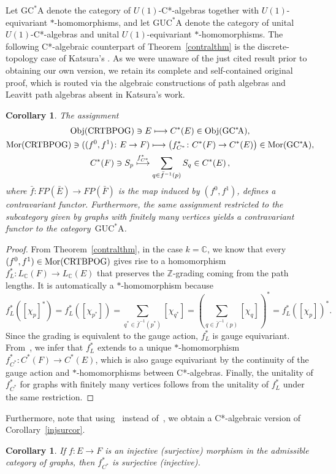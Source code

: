 \documentclass[12pt,times,a4paper]{amsart}
\newtheorem{corollary}[theorem]{Corollary}
\numberwithin{equation}{section}
\numberwithin{equation}{section}
\begin{document}
Let $\mathrm{GC^*\!A}$ denote the category of $U(1)$-C*-algebras together with $U(1)$-equivariant $*$-homo\-morphisms,
 and let $\mathrm{GUC^*\!A}$ denote the category of unital $U(1)$-C*-algebras and unital $U(1)$-equivariant $*$-homomorphisms.
The following C*-algebraic counterpart of Theorem~\ref{contralthm} is the discrete-topology case of Katsura's
\cite[Proposition~2.9]{t-k06}. As we were
unaware of the just cited result prior to obtaining our own version, we retain its complete and self-contained original proof,
which is routed via the algebraic constructions of path algebras and Leavitt path algebras absent in Katsura's work.
\begin{corollary}\label{corgc*}
The assignment
\begin{gather*}
\mathrm{Obj}({\rm CRTBPOG})\ni E\stackrel{}{\longmapsto}C^*(E)\in\mathrm{Obj}(\mathrm{GC^*\!A}),\nonumber\\
\mathrm{Mor}({\rm CRTBPOG})\ni ((f^0,f^1)\colon E\to F)
\stackrel{}{\longmapsto}\big(f^*_{C^*}\colon C^*(F)\to C^*(E)\big)\in\mathrm{Mor}(\mathrm{GC^*\!A}),
\nonumber\\
C^*(F)\ni S_p\stackrel{f^*_{C^*}}{\longmapsto}\sum_{q\in \bar{f}^{-1}(p)}S_q\in C^*(E)\,,%
\nonumber
\end{gather*}
where $\bar{f}\colon FP(\bar{E})\to FP(\bar{F})$ is the map induced by $(f^0,f^1)$, defines a contravariant functor. Furthermore, 
the same assignment restricted to the subcategory 
given by graphs with finitely many vertices yields a contravariant functor to the category~$\mathrm{GUC^*\!A}$. 
\end{corollary}
\begin{proof}
From Theorem~\ref{contralthm}, in the case $k=\mathbb{C}$, we know that every 
$(f^0,f^1)\in{\rm Mor}(\mathrm{CRTBPOG})$ gives rise to 
a homomorphism ${f}^*_L\colon L_\mathbb{C}(F)\to L_\mathbb{C}(E)$ that preserves the $\mathbb{Z}$-grading
 coming from the path lengths. It is automatically a $*$-homomorphism because
\begin{equation}
{f}^*_L([\chi_p]^*)={f}^*_L([\chi_{p^*}])=\sum_{q^*\in\bar{f}^{-1}(p^*)}[\chi_{q^*}]=\left(\sum_{q\in\bar{f}^{-1}(p)}
[\chi_q]\right)^*={f}^*_L([\chi_p])^*.
\end{equation}
Since the grading is equivalent to the gauge action, ${f}^*_L$ is gauge equivariant. 
From~\cite[Theorem~4.4]{at-11}, we infer that ${f}^*_L$ extends to
 a unique $*$-homomorphism $f^*_{C^*}\colon C^*(F)\to C^*(E)$, which is also gauge equivariant by the continuity
of the gauge action and $*$-homomorphisms between C*-algebras. Finally, the unitality of $f^*_{C^*}$ for graphs with
finitely many vertices follows from the unitality of  ${f}^*_L$ under the same restriction.
\end{proof}
Furthermore, note that using~\cite[Theorem~5.2.12]{aasm17} instead of~\cite[Theorem~2.2.15]{aasm17}, 
we obtain a C*-algebraic version of Corollary~\ref{injsurcor}.
\begin{corollary}\label{c*injsur}
If $f:E\to F$ is an injective (surjective) morphism in the admissible category of graphs, then $f^*_{C^*}$ is surjective (injective).
\end{corollary}
\end{document}
